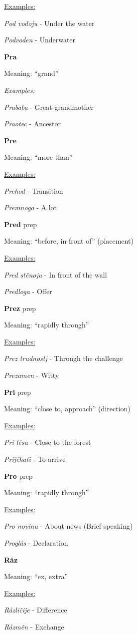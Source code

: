 \underline{Examples:}

\textit{Pod vodoju} - Under the water

\textit{Podvoden} - Underwater

\textbf{Pra}

Meaning: “grand”

\textit{Examples:}

\textit{Prababa} - Great-grandmother

\textit{Praotec} - Ancestor

\textbf{Pre}

Meaning: “more than”

\underline{Examples:}

\textit{Prehod} - Transition

\textit{Premnogo} - A lot

\textbf{Pred} \gls{prep}

Meaning: “before, in front of” (placement)

\underline{Examples:}

\textit{Pred stěnoju} - In front of the wall

\textit{Predloga} - Offer

\textbf{Prez} \gls{prep}

Meaning: “rapidly through”

\underline{Examples:}

\textit{Prez trudnostj} - Through the challenge

\textit{Prezumen} - Witty

\textbf{Pri} \gls{prep}

Meaning: “close to, approach” (direction)

\underline{Examples:}

\textit{Pri lěsu} - Close to the forest

\textit{Prijěhati} - To arrive

\textbf{Pro} \gls{prep}

Meaning: “rapidly through”

\underline{Examples:}

\textit{Pro novinu} - About news (Brief speaking)

\textit{Proglås} - Declaration

\textbf{Råz}

Meaning: “ex, extra”

\underline{Examples:}

\textit{Råzličije} - Difference

\textit{Råzměn} - Exchange

